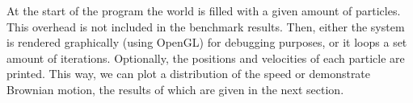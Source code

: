 At the start of the program the world is filled with a given amount of 
particles. This overhead is not included in the benchmark results. Then, 
either the system is rendered graphically (using OpenGL) for debugging 
purposes, or it loops a set amount of iterations. Optionally, the 
positions and velocities of each particle are printed. This way, we can 
plot a distribution of the speed or demonstrate Brownian motion, the results of 
which are given in the next section.
